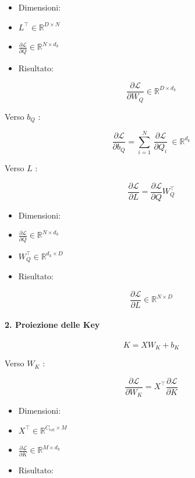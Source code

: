 \documentclass[
  11pt,
]{article}
\begin{document}
\begin{itemize}
\item
  Dimensioni:
\item
  \(L^{\top} \in \mathbb{R}^{D \times N}\)
\item
  \(\frac{\partial\mathcal{L}}{\partial Q} \in \mathbb{R}^{N \times d_{k}}\)
\item
  Risultato:
\end{itemize}

\[\frac{\partial\mathcal{L}}{\partial W_{Q}} \in \mathbb{R}^{D \times d_{k}}\]

Verso \(b_{Q}\) :

\[\frac{\partial\mathcal{L}}{\partial b_{Q}} = \sum_{i = 1}^{N}\,\frac{\partial\mathcal{L}}{\partial Q_{i}}\  \in \mathbb{R}^{d_{k}}\]

Verso \(L\) :

\[\frac{\partial\mathcal{L}}{\partial L} = \frac{\partial\mathcal{L}}{\partial Q}W_{Q}^{\top}\]

\begin{itemize}
\item
  Dimensioni:
\item
  \(\frac{\partial\mathcal{L}}{\partial Q} \in \mathbb{R}^{N \times d_{k}}\)
\item
  \(W_{Q}^{\top} \in \mathbb{R}^{d_{k} \times D}\)
\item
  Risultato:
\end{itemize}

\[\frac{\partial\mathcal{L}}{\partial L} \in \mathbb{R}^{N \times D}\]

\paragraph{2. Proiezione delle Key}

\[K = XW_{K} + b_{K}\]

Verso \(W_{K}\) :

\[\frac{\partial\mathcal{L}}{\partial W_{K}} = X^{\top}\frac{\partial\mathcal{L}}{\partial K}\]

\begin{itemize}
\item
  Dimensioni:
\item
  \(X^{\top} \in \mathbb{R}^{C_{\text{tot}} \times M}\)
\item
  \(\frac{\partial\mathcal{L}}{\partial K} \in \mathbb{R}^{M \times d_{k}}\)
\item
  Risultato:
\end{itemize}
\end{document}
